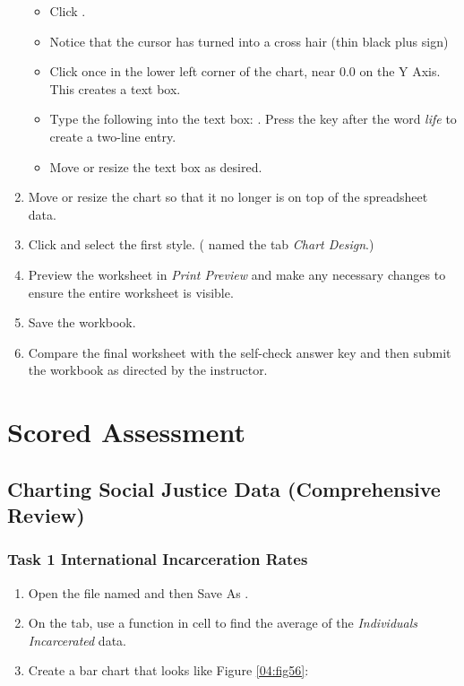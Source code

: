 \begin{enumerate}[resume]
	\begin{itemize}
		\item Click .
		\item Notice that the cursor has turned into a cross hair (thin black plus sign)
		\item Click once in the lower left corner of the chart, near $ 0.0 $ on the Y Axis. This creates a text box.
		\item Type the following into the text box: . Press the  key after the word \textit{life} to create a two-line entry. 
		\item Move or resize the text box as desired.
	\end{itemize}
	
	\item Move or resize the chart so that it no longer is on top of the spreadsheet data.
	\item Click  and select the first style. ( named the tab \textit{Chart Design}.)
	\item Preview the  worksheet in \textit{Print Preview} and make any necessary changes to ensure the entire worksheet is visible.
	\item Save the  workbook.
	\item Compare the final worksheet with the self-check answer key and then submit the  workbook as directed by the instructor.
\end{enumerate}

\section{Scored Assessment}

\subsection{Charting Social Justice Data (Comprehensive Review)}

\subsubsection{Task 1 International Incarceration Rates}

\begin{enumerate}
	\item Open the file named  and then Save As .
	\item On the  tab, use a function in cell  to find the average of the \textit{Individuals Incarcerated} data.
	\item Create a bar chart that looks like Figure \ref{04:fig56}:
\end{enumerate}

